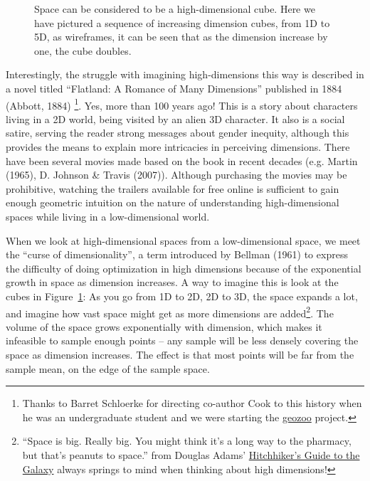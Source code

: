 \documentclass[
  letterpaper,
]{krantz}
\begin{document}

\begin{figure}


\caption{\label{fig-dimension-cubes}Space can be considered to be a
high-dimensional cube. Here we have pictured a sequence of increasing
dimension cubes, from 1D to 5D, as wireframes, it can be seen that as
the dimension increase by one, the cube doubles.}

\end{figure}%

Interestingly, the struggle with imagining high-dimensions this way is
described in a novel titled ``Flatland: A Romance of Many Dimensions''
published in 1884 (Abbott, 1884) \footnote{Thanks to Barret Schloerke
  for directing co-author Cook to this history when he was an
  undergraduate student and we were starting the
  \href{http://schloerke.com/geozoo/}{geozoo} project.}. Yes, more than
100 years ago! This is a story about characters living in a 2D world,
being visited by an alien 3D character. It also is a social satire,
serving the reader strong messages about gender inequity, although this
provides the means to explain more intricacies in perceiving dimensions.
There have been several movies made based on the book in recent decades
(e.g. Martin (1965), D. Johnson \& Travis (2007)). Although purchasing
the movies may be prohibitive, watching the trailers available for free
online is sufficient to gain enough geometric intuition on the nature of
understanding high-dimensional spaces while living in a low-dimensional
world.

When we look at high-dimensional spaces from a low-dimensional space, we
meet the ``curse of dimensionality'', a term introduced by Bellman
(1961) to express the difficulty of doing optimization in high
dimensions because of the exponential growth in space as dimension
increases. A way to imagine this is look at the cubes in
Figure~\ref{fig-dimension-cubes}: As you go from 1D to 2D, 2D to 3D, the
space expands a lot, and imagine how vast space might get as more
dimensions are added\footnote{``Space is big. Really big. You might
  think it's a long way to the pharmacy, but that's peanuts to space.''
  from Douglas Adams'
  \href{https://en.wikipedia.org/wiki/The_Hitchhiker\%27s_Guide_to_the_Galaxy\#Stage_shows}{Hitchhiker's
  Guide to the Galaxy} always springs to mind when thinking about high
  dimensions!}. The volume of the space grows exponentially with
dimension, which makes it infeasible to sample enough points -- any
sample will be less densely covering the space as dimension increases.
The effect is that most points will be far from the sample mean, on the
edge of the sample space.
\end{document}
